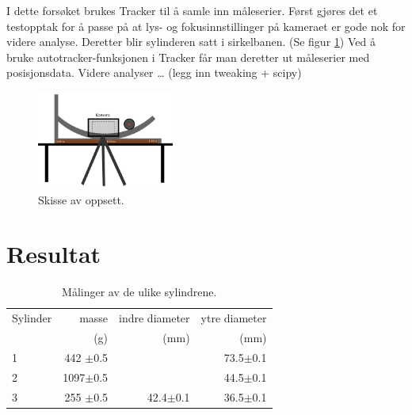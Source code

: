 \documentclass[5p]{elsarticle}
\begin{document}
I dette forsøket brukes Tracker til å samle inn måleserier. 
Først gjøres det et testopptak for å passe på at lys- og fokusinnstillinger på kameraet er gode nok for videre analyse.
Deretter blir sylinderen satt i sirkelbanen. (Se figur \ref{Fig Oppsett})
Ved å bruke autotracker-funksjonen i Tracker får man deretter ut måleserier med posisjonsdata.
Videre analyser \dots 
(legg inn tweaking + scipy) 

\begin{figure}[] 
	\begin{center}
		\includegraphics[width=0.4\textwidth]{skisse}
	\end{center}
	\caption{Skisse av oppsett.}
	\label{Fig Oppsett} %
\end{figure}

\section{Resultat}

\begin{table}[htb]
	\begin{center}
		\caption{Målinger av de ulike sylindrene.}
		\label{MinLilleTabell}	%
		\begin{tabular}{lrrr} 		%
			\hline 								%
		    Sylinder &  masse  & indre diameter & ytre diameter \\ %
			&  (g)    &   (mm)   &  (mm)    \\ %
			\hline												
			1   &  442 \(\pm\)0.5 & 	  & 73.5\(\pm\)0.1 \\ %
			2   &  1097\(\pm\)0.5 & 	  & 44.5\(\pm\)0.1 \\ %
			3   &  255 \(\pm\)0.5 & 42.4\(\pm\)0.1 & 36.5\(\pm\)0.1 \\ %
			\hline
		\end{tabular}
	\end{center}
\end{table}
\end{document}
